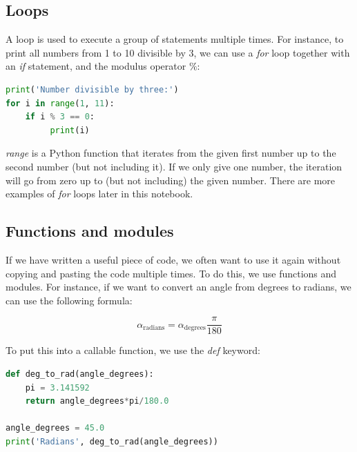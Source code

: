 \documentclass[a4paper , 12pt]{book}
\begin{document}
\subsection{Loops}

A loop is used to execute a group of statements multiple times. For instance, to print all numbers from 1 to 10 divisible by 3, we can use a \textit{for} loop together with an \textit{if} statement, and the modulus operator $\%$:

\begin{center}
\begin {lstlisting}[language=Python, frame=single]
print('Number divisible by three:')
for i in range(1, 11):
    if i %
         print(i)
\end{lstlisting}
\end{center}

\textit{range} is a Python function that iterates from the given first number up to the second number (but not including it). If we only give one number, the iteration will go from zero up to (but not including) the given number. There are more examples of \textit{for} loops later in this notebook.

\subsection{Functions and modules}

If we have written a useful piece of code, we often want to use it again without copying and pasting the code multiple times. To do this, we use functions and modules. For instance, if we want to convert an angle from degrees to radians, we can use the following formula: 

\begin{equation}
    \alpha_\text{radians} = \alpha_\text{degrees}\frac{\pi}{180}
\end{equation}    

To put this into a callable function, we use the \textit{def} keyword:

\begin{center}
\begin {lstlisting}[language=Python, frame=single]
def deg_to_rad(angle_degrees):
    pi = 3.141592
    return angle_degrees*pi/180.0

angle_degrees = 45.0
print('Radians', deg_to_rad(angle_degrees))
\end{lstlisting}
\end{center}
\end{document}
